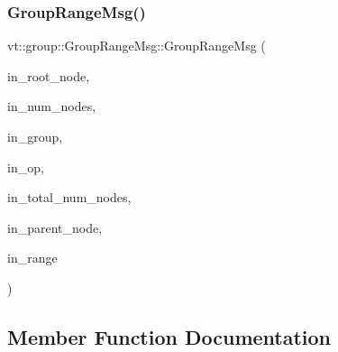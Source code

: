 \mbox{\label{structvt_1_1group_1_1_group_range_msg_abdce0fab287c1c31fc36ce73a931f5e9}} 
\subsubsection{\texorpdfstring{Group\+Range\+Msg()}{GroupRangeMsg()}\hspace{0.1cm}{\footnotesize\ttfamily [2/2]}}
{\footnotesize\ttfamily vt\+::group\+::\+Group\+Range\+Msg\+::\+Group\+Range\+Msg (\begin{DoxyParamCaption}\item[{\hyperlink{namespacevt_a866da9d0efc19c0a1ce79e9e492f47e2}{Node\+Type} const \&}]{in\+\_\+root\+\_\+node,  }\item[{\hyperlink{namespacevt_a866da9d0efc19c0a1ce79e9e492f47e2}{Node\+Type} const \&}]{in\+\_\+num\+\_\+nodes,  }\item[{\hyperlink{namespacevt_a27b5e4411c9b6140c49100e050e2f743}{Group\+Type} const \&}]{in\+\_\+group,  }\item[{\hyperlink{namespacevt_1_1group_a73f2624ddeb535b39a08b6524f26b244}{Remote\+Operation\+I\+D\+Type}}]{in\+\_\+op,  }\item[{\hyperlink{namespacevt_a866da9d0efc19c0a1ce79e9e492f47e2}{Node\+Type} const \&}]{in\+\_\+total\+\_\+num\+\_\+nodes,  }\item[{\hyperlink{namespacevt_a866da9d0efc19c0a1ce79e9e492f47e2}{Node\+Type} const \&}]{in\+\_\+parent\+\_\+node,  }\item[{\hyperlink{structvt_1_1group_1_1_group_range_msg_a49fdcbb2ae53a4c5778e60f306c8f5e6}{Range\+Type} $\ast$}]{in\+\_\+range }\end{DoxyParamCaption})\hspace{0.3cm}{\ttfamily [inline]}}



\subsection{Member Function Documentation}
\mbox{\label{structvt_1_1group_1_1_group_range_msg_a9a3b75cee8d60df55ecf7c6f7a3772f1}} 
